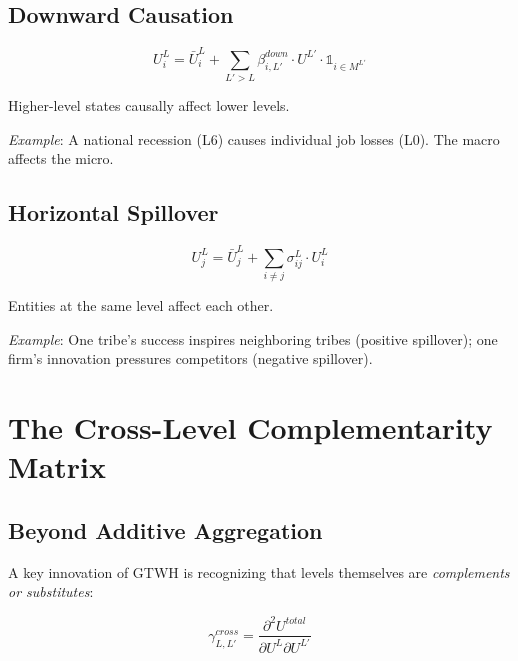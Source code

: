 \documentclass[12pt,a4paper]{article}
\begin{document}
\subsection{Downward Causation}

\begin{equation}
U^L_i = \bar{U}^L_i + \sum_{L' > L} \beta^{down}_{i,L'} \cdot U^{L'} \cdot \mathbb{1}_{i \in M^{L'}}
\label{eq:downward}
\end{equation}

Higher-level states causally affect lower levels.

\textit{Example}: A national recession (L6) causes individual job losses (L0). 
The macro affects the micro.

\subsection{Horizontal Spillover}

\begin{equation}
U^L_j = \bar{U}^L_j + \sum_{i \neq j} \sigma^L_{ij} \cdot U^L_i
\label{eq:horizontal}
\end{equation}

Entities at the same level affect each other.

\textit{Example}: One tribe's success inspires neighboring tribes (positive spillover); 
one firm's innovation pressures competitors (negative spillover).

\section{The Cross-Level Complementarity Matrix}
\label{sec:cross-level}

\subsection{Beyond Additive Aggregation}

A key innovation of GTWH is recognizing that levels themselves are 
\textit{complements or substitutes}:

\begin{equation}
\gamma^{cross}_{L,L'} = \frac{\partial^2 U^{total}}{\partial U^L \partial U^{L'}}
\label{eq:cross-complementarity}
\end{equation}
\end{document}

